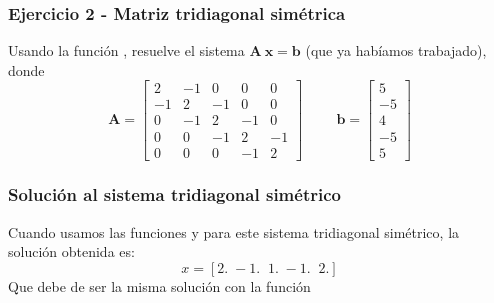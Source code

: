 \begin{frame}
\frametitle{Ejercicio 2 - Matriz tridiagonal simétrica}
Usando la función , resuelve el sistema $\mathbf{A \: x} = \mathbf{b}$ (que ya habíamos trabajado), donde
\begin{equation*} 
\mathbf{A} =  \begin{bmatrix}
2 & -1 & 0 & 0 & 0 \\
-1 & 2 & -1 & 0 & 0 \\
0 & -1 & 2 & -1 & 0 \\
0 & 0 & -1 & 2 & -1 \\
0 & 0 & 0 & -1 & 2
\end{bmatrix}
\hspace{1cm}
\mathbf{b} =
\begin{bmatrix}
5 \\
-5 \\
4 \\
-5 \\
5
\end{bmatrix}
\end{equation*}
\end{frame}
\begin{frame}
\frametitle{Solución al sistema tridiagonal simétrico}
Cuando usamos las funciones  y  para este sistema tridiagonal simétrico, la solución obtenida es:
\\
\bigskip
\pause
\[x = [ 2. \; -1. \;\; 1. \; -1. \;\;  2.] \]
Que debe de ser la misma solución con la función 
\end{frame}
